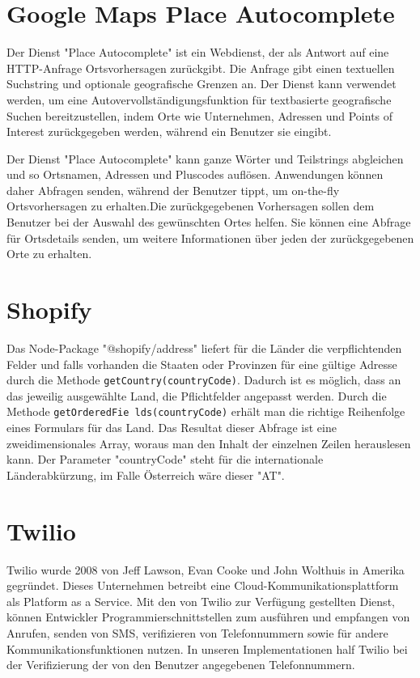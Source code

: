 \section{Google Maps Place Autocomplete}

Der Dienst "Place Autocomplete" ist ein Webdienst, der als Antwort auf eine HTTP-Anfrage Ortsvorhersagen zurückgibt. Die Anfrage gibt einen textuellen Suchstring und optionale geografische Grenzen an. Der Dienst kann verwendet werden, um eine Autovervollständigungsfunktion für textbasierte geografische Suchen bereitzustellen, indem Orte wie Unternehmen, Adressen und Points of Interest zurückgegeben werden, während ein Benutzer sie eingibt.\cite{googlePlacesAPI}

Der Dienst "Place Autocomplete" kann ganze Wörter und Teilstrings abgleichen und so Ortsnamen, Adressen und Pluscodes auflösen. Anwendungen können daher Abfragen senden, während der Benutzer tippt, um on-the-fly Ortsvorhersagen zu erhalten.Die zurückgegebenen Vorhersagen sollen dem Benutzer bei der Auswahl des gewünschten Ortes helfen. Sie können eine Abfrage für Ortsdetails senden, um weitere Informationen über jeden der zurückgegebenen Orte zu erhalten.\cite{googlePlacesAPI}

\section{Shopify}
Das Node-Package "@shopify/address" liefert für die Länder die verpflichtenden Felder und falls vorhanden die Staaten oder Provinzen für eine gültige Adresse durch die Methode \texttt{getCountry(countryCode)}. Dadurch ist es möglich, dass an das jeweilig ausgewählte Land, die Pflichtfelder angepasst werden. Durch die Methode \texttt{getOrderedFie lds(countryCode)} erhält man die richtige Reihenfolge eines Formulars für das Land. Das Resultat dieser Abfrage ist eine zweidimensionales Array, woraus man den Inhalt der einzelnen Zeilen herauslesen kann. Der Parameter "countryCode" steht für die internationale Länderabkürzung, im Falle Österreich wäre dieser "AT". \autocite{shopifyNPM}

\section{Twilio} \label{sec:twilio}
Twilio wurde 2008 von Jeff Lawson, Evan Cooke und John Wolthuis in Amerika gegründet. Dieses Unternehmen betreibt eine Cloud-Kommunikationsplattform als Platform as a Service. Mit den von Twilio zur Verfügung gestellten Dienst, können Entwickler Programmierschnittstellen zum ausführen und empfangen von Anrufen, senden von SMS, verifizieren von Telefonnummern sowie für andere Kommunikationsfunktionen nutzen. In unseren Implementationen half Twilio bei der Verifizierung der von den Benutzer angegebenen Telefonnummern. \cite{twilioWebsite}

